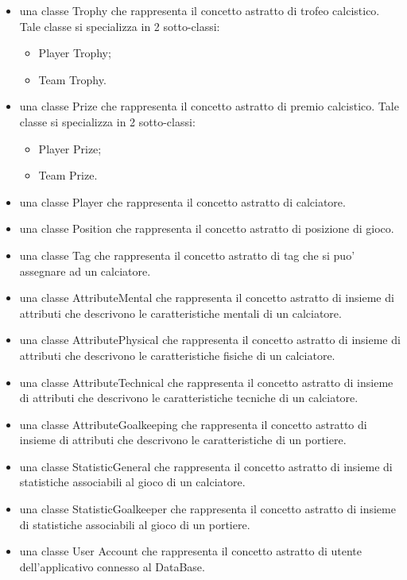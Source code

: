 \begin{itemize}
	\item una classe Trophy che rappresenta il concetto astratto di trofeo calcistico.
		Tale classe si specializza in 2 sotto-classi:
		\begin{itemize}
			\item Player Trophy;
			\item Team Trophy.
		\end{itemize}

	\item una classe Prize che rappresenta il concetto astratto di premio calcistico.
		Tale classe si specializza in 2 sotto-classi:	
		\begin{itemize}
			\item Player Prize;
			\item Team Prize.
		\end{itemize}	

	\item una classe Player che rappresenta il concetto astratto di calciatore.

	\item una classe Position che rappresenta il concetto astratto di posizione di gioco.

	\item una classe Tag che rappresenta il concetto astratto di tag che si puo' assegnare
		ad un calciatore.

	\item una classe AttributeMental che rappresenta il concetto astratto di insieme di
		attributi che descrivono le caratteristiche mentali di un calciatore.
			
	\item una classe AttributePhysical che rappresenta il concetto astratto di insieme di
		attributi che descrivono le caratteristiche fisiche di un calciatore.
	
	\item una classe AttributeTechnical che rappresenta il concetto astratto di insieme di
		attributi che descrivono le caratteristiche tecniche di un calciatore.
	
	\item una classe AttributeGoalkeeping che rappresenta il concetto astratto di insieme di
		attributi che descrivono le caratteristiche di un portiere.

	\item una classe StatisticGeneral che rappresenta il concetto astratto di insieme di
		statistiche associabili al gioco di un calciatore.
		
	\item una classe StatisticGoalkeeper che rappresenta il concetto astratto di insieme di
		statistiche associabili al gioco di un portiere.

	\item una classe User Account che rappresenta il concetto astratto di utente dell'applicativo
		connesso al DataBase.
		
\end{itemize}

